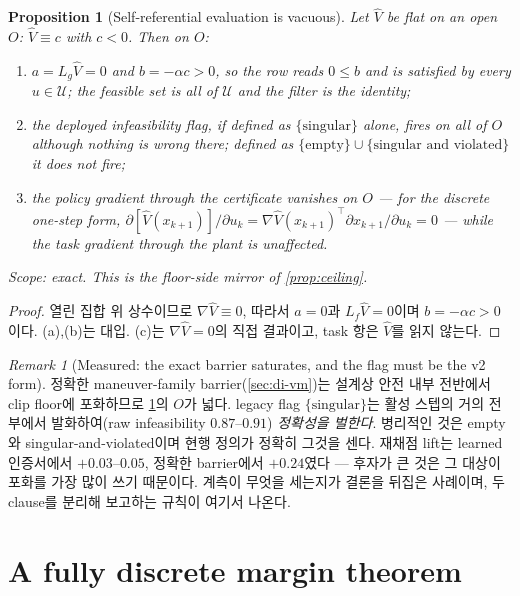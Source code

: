 \documentclass[11pt]{article}
\theoremstyle{plain}
\newtheorem{proposition}[theorem]{Proposition}
\theoremstyle{definition}
\theoremstyle{remark}
\newtheorem{remark}[theorem]{Remark}
\newcommand{\calU}{\mathcal{U}}
\newcommand{\Vhat}{\widehat V}
\newcommand{\Lg}{L_g}
\newcommand{\Lf}{L_f}
\newcommand{\grad}{\nabla}
\begin{document}
\begin{proposition}[Self-referential evaluation is vacuous]\label{prop:vacuum}
Let $\Vhat$ be flat on an open $O$: $\Vhat\equiv c$ with $c<0$. Then on $O$:
\begin{enumerate}[label=(\alph*)]
  \item $a=\Lg\Vhat=0$ and $b=-\alpha c>0$, so the row reads $0\le b$ and is satisfied by
  \emph{every} $u\in\calU$; the feasible set is all of $\calU$ and the filter is the identity;
  \item the deployed infeasibility flag, if defined as $\{\text{singular}\}$ alone, fires on all
  of $O$ although nothing is wrong there; defined as $\{\text{empty}\}\cup\{\text{singular and
  violated}\}$ it does not fire;
  \item the policy gradient through the certificate vanishes on $O$ --- for the discrete
  one-step form, $\partial[\Vhat(x_{k+1})]/\partial u_k=\grad\Vhat(x_{k+1})^\top
  \partial x_{k+1}/\partial u_k=0$ --- while the task gradient through the plant is unaffected.
\end{enumerate}
Scope: exact. This is the floor-side mirror of \cref{prop:ceiling}.
\end{proposition}
\begin{proof}
열린 집합 위 상수이므로 $\grad\Vhat\equiv0$, 따라서 $a=0$과 $\Lf\Vhat=0$이며 $b=-\alpha c>0$이다.
(a),(b)는 대입. (c)는 $\grad\Vhat=0$의 직접 결과이고, task 항은 $\Vhat$를 읽지 않는다.
\end{proof}

\begin{remark}[Measured: the exact barrier saturates, and the flag must be the v2 form]\label{rem:cpsv2}
정확한 maneuver-family barrier(\cref{sec:di-vm})는 설계상 안전 내부 전반에서 clip floor에 포화하므로
\cref{prop:vacuum}의 $O$가 넓다. legacy flag $\{\text{singular}\}$는 활성 스텝의 거의 전부에서
발화하여(raw infeasibility $0.87$--$0.91$) \emph{정확성을 벌한다}. 병리적인 것은 empty와
singular-and-violated이며 현행 정의가 정확히 그것을 센다. 재채점 lift는 learned 인증서에서
$+0.03$--$0.05$, 정확한 barrier에서 $+0.24$였다 --- 후자가 큰 것은 그 대상이 포화를 가장 많이
쓰기 때문이다. 계측이 무엇을 세는지가 결론을 뒤집은 사례이며, 두 clause를 분리해 보고하는 규칙이
여기서 나온다.
\end{remark}

\section{A fully discrete margin theorem}\label{sec:di-margin}
\end{document}
